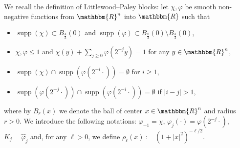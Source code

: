 \documentclass[11pt]{article}
\newcommand{\assign}{:=}
\newcommand{\tmop}[1]{\ensuremath{\operatorname{#1}}}
\begin{document}
We recall the definition of Littlewood--Paley blocks: let $\chi, \varphi$ be
smooth non-negative functions from $\mathbbm{R}^n$ into $\mathbbm{R}$ such that
\begin{itemize}
  \item $\tmop{supp} (\chi) \subset B_{\frac{4}{3}} (0)$ and $\tmop{supp}
  (\varphi) \subset B_{\frac{8}{3}} (0) \setminus B_{\frac{3}{4}} (0)$,
  
  \item $\chi, \varphi \leqslant 1$ and $\chi (y) + \sum_{j \geq 0} \varphi
  (2^{- j} y) = 1$ for any $y \in \mathbbm{R}^n$,
  
  \item $\tmop{supp} (\chi) \cap \tmop{supp} (\varphi (2^{- i} \cdot)) =
  \emptyset$ for $i \geqslant 1$,
  
  \item $\tmop{supp} (\varphi (2^{- j} \cdot)) \cap \tmop{supp} (\varphi (2^{-
  i} \cdot)) = \emptyset$ if $| i - j | > 1$,
\end{itemize}
where by $B_r (x)$ we denote the ball of center $x \in \mathbbm{R}^n$ and
radius $r > 0$. We introduce the following notations: $\varphi_{- 1} = \chi$,
$\varphi_j (\cdot) = \varphi (2^{- j} \cdot)$, $K_j = \hat{\varphi}_j$ and,
for any $\ell > 0$, we define $\rho_{\ell} (x) \assign (1 + | x |^2)^{- \ell /
2}$.

\
\end{document}
